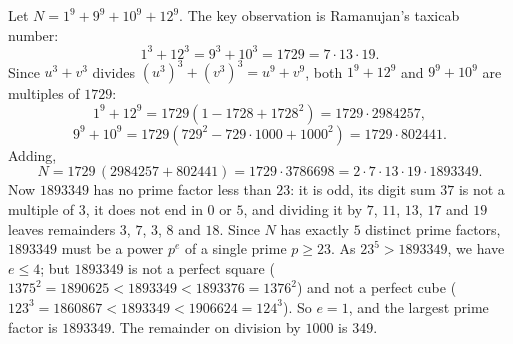 Let $N=1^9+9^9+10^9+12^9$. The key observation is Ramanujan's taxicab number:
\[1^3+12^3=9^3+10^3=1729=7\cdot13\cdot19 .\]
Since $u^3+v^3$ divides $(u^3)^3+(v^3)^3=u^9+v^9$, both $1^9+12^9$ and $9^9+10^9$ are multiples of $1729$:
\[1^9+12^9=1729\left(1-1728+1728^2\right)=1729\cdot2984257,\]
\[9^9+10^9=1729\left(729^2-729\cdot1000+1000^2\right)=1729\cdot802441 .\]
Adding,
\[N=1729\,(2984257+802441)=1729\cdot3786698=2\cdot7\cdot13\cdot19\cdot1893349 .\]
Now $1893349$ has no prime factor less than $23$: it is odd, its digit sum $37$ is not a multiple of $3$, it does not end in $0$ or $5$, and dividing it by $7$, $11$, $13$, $17$ and $19$ leaves remainders $3$, $7$, $3$, $8$ and $18$. Since $N$ has exactly $5$ distinct prime factors, $1893349$ must be a power $p^e$ of a single prime $p\ge23$. As $23^5>1893349$, we have $e\le4$; but $1893349$ is not a perfect square ($1375^2=1890625<1893349<1893376=1376^2$) and not a perfect cube ($123^3=1860867<1893349<1906624=124^3$). So $e=1$, and the largest prime factor is $1893349$. The remainder on division by $1000$ is $\boxed{349}$.

